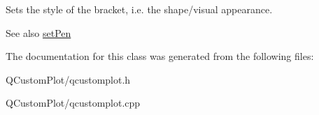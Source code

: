 Sets the style of the bracket, i.\+e. the shape/visual appearance.

\begin{DoxySeeAlso}{See also}
\mbox{\hyperlink{class_q_c_p_item_bracket_ab13001d9cc5d8f9e56ea15bdda682acb}{set\+Pen}} 
\end{DoxySeeAlso}


The documentation for this class was generated from the following files\+:\begin{DoxyCompactItemize}
\item 
Q\+Custom\+Plot/qcustomplot.\+h\item 
Q\+Custom\+Plot/qcustomplot.\+cpp\end{DoxyCompactItemize}
